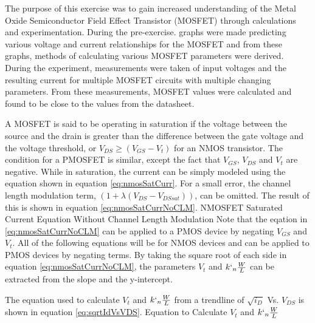 
\def \labnum	{\#2}
\def \tonames   {Tyler Nicholson}
\def \disptitle	{MOSFET Characterization}
\def \datestart	{03-06-2015}
\def \dateend	{03-20-2015}






The purpose of this exercise was to gain increased understanding of the Metal Oxide Semiconductor Field Effect Transistor (MOSFET) through calculations and experimentation. 
During the pre-exercise. graphs were made predicting various voltage and current relationships for the MOSFET and from these graphs, methods of calculating various MOSFET parameters were derived. 
During the experiment, measurements were taken of input voltages and the resulting current for multiple MOSFET circuits with multiple changing parameters. 
From these measurements, MOSFET values were calculated and found to be close to the values from the datasheet. 


A MOSFET is said to be operating in saturation if the voltage between the source and the drain is greater than the difference between the gate voltage and the voltage threshold, or $V_{DS} \geq (V_{GS}-V_t)$ for an NMOS transistor. The condition for a PMOSFET is similar, except the fact that $V_{GS}$, $V_{DS}$ and $V_t$ are negative. 
While in saturation, the current can be simply modeled using the equation shown in equation \ref{eq:nmosSatCurr}.
For a small error, the channel length modulation term, $(1+\lambda(V_{DS}-V_{DSsat}))$, can be omitted. The result of this is shown in equation \ref{eq:nmosSatCurrNoCLM}. 
	{NMOSFET Saturated Current Equation Without Channel Length Modulation}
Note that the eqation in \ref{eq:nmosSatCurrNoCLM} can be applied to a PMOS device by negating $V_{GS}$ and $V_t$. All of the following equations will be for NMOS devices and can be applied to PMOS devices by negating terms. 
By taking the square root of each side in equation \ref{eq:nmosSatCurrNoCLM}, the parameters $V_t$ and $k`_n \frac{W}{L}$ can be extracted from the slope and the y-intercept. 

The equation used to calculate $V_t$ and $k`_n \frac{W}{L}$ from a trendline of $\sqrt{i_D}$ Vs. $V_{DS}$ is shown in equation \ref{eq:sqrtIdVsVDS}. 
	{Equation to Calculate $V_t$ and $k`_n \frac{W}{L}$}

